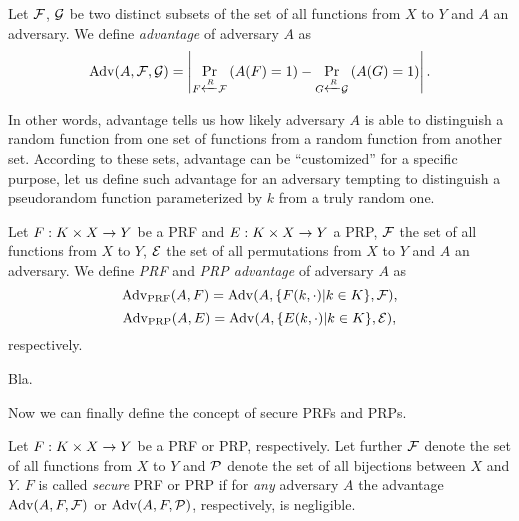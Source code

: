 
\begin{defn}[Advantage]
\label{def:advant}
	Let $\cal F$, $\cal G$ be two distinct subsets of the set of all functions from $X$ to $Y$ and $A$ an adversary. We define {\em advantage} of adversary $A$ as
	\[
		\operatorname*{Adv}(A,{\cal F},{\cal G}) = \left| \Pr\limits_{F\xleftarrow{R} {\cal F}}\left(A(F)=1\right) - \Pr\limits_{G\xleftarrow{R} {\cal G}}\left(A(G)=1\right) \right| .
	\]
\end{defn}

In other words, advantage tells us how likely adversary $A$ is able to distinguish a random function from one set of functions from a random function from another set. According to these sets, advantage can be ``customized'' for a specific purpose, let us define such advantage for an adversary tempting to distinguish a pseudorandom function parameterized by $k$ from a truly random one.

\begin{defn}
\label{def:prfadvant}\label{def:prpadvant}
	Let $F: K\times X\rightarrow Y$ be a PRF and $E: K\times X\rightarrow Y$ a PRP, $\cal F$ the set of all functions from $X$ to $Y$, $\cal E$ the set of all permutations from $X$ to $Y$ and $A$ an adversary. We define {\em PRF} and {\em PRP advantage} of adversary $A$ as
	\[
		\operatorname*{Adv_{PRF}}(A,F) = \operatorname*{Adv}(A,\{F(k,\cdot)|k\in K\},{\cal F}) ,
	\]
	\[
		\operatorname*{Adv_{PRP}}(A,E) = \operatorname*{Adv}(A,\{E(k,\cdot)|k\in K\},{\cal E}) ,
	\]
	respectively.
\end{defn}



\begin{example}
	Bla. %
\end{example}

Now we can finally define the concept of secure PRFs and PRPs.

\begin{defn}
\label{def:secprf}\label{def:secprp}
	Let $F: K\times X\rightarrow Y$ be a PRF or PRP, respectively. Let further $\cal F$ denote the set of all functions from $X$ to $Y$ and $\cal P$ denote the set of all bijections between $X$ and $Y$. $F$ is called {\em secure} PRF or PRP if for {\em any} adversary $A$ the advantage $\operatorname*{Adv}(A,F,{\cal F})$ or $\operatorname*{Adv}(A,F,{\cal P})$, respectively, is negligible.   %
\end{defn}

